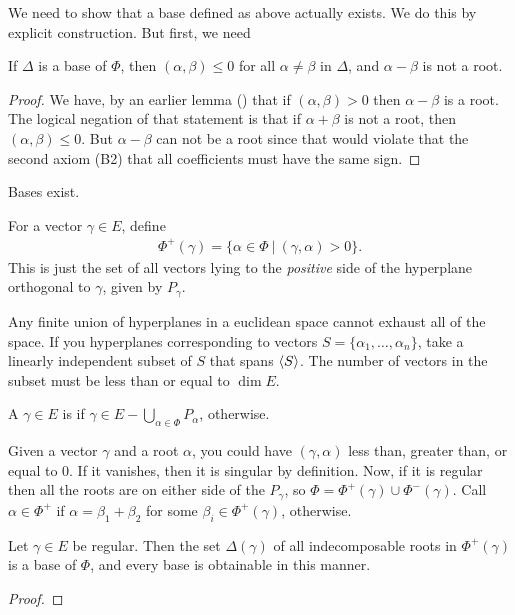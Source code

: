 We need to show that a base defined as above actually exists. We do this by explicit construction. But first, we need 
\begin{lemma}
    If $\Delta$ is a base of $\Phi$, then $(\alpha,\beta)\leq 0$  for all $\alpha\neq\beta$ in $\Delta$, and $\alpha-\beta$ is not a root.
\end{lemma}
\begin{proof}
    We have, by an earlier lemma () that if $(\alpha,\beta)>0$ then $\alpha - \beta$ is a root. The logical negation of that statement is that if $\alpha + \beta$ is not a root, then $(\alpha,\beta)\leq 0$. But $\alpha-\beta$ can not be a root since that would violate that the second axiom (B2) that all coefficients must have the same sign.
\end{proof}
\begin{theorem}
    Bases exist.
\end{theorem}
    For a vector $\gamma\in E$, define 
    \begin{align}
        \Phi^+(\gamma) = \{\alpha\in\Phi\ |\ (\gamma,\alpha)>0\}.
    \end{align}
    This is just the set of all vectors lying to the \emph{positive} side of the hyperplane orthogonal to $\gamma$, given by $P_\gamma$. 
    \begin{insight}
        Any finite union of hyperplanes in a euclidean space cannot exhaust all of the space. If you hyperplanes corresponding to vectors $S=\{\alpha_1,\dotsc,\alpha_n\}$, take a linearly independent subset of $S$ that spans $\langle S\rangle$. The number of vectors in the subset must be less than or equal to $\dim E$. 
    \end{insight}

    A $\gamma\in E$ is  if $\gamma\in E - \bigcup_{\alpha\in\Phi}P_\alpha$,  otherwise.

    Given a vector $\gamma$ and a root $\alpha$, you could have $(\gamma,\alpha)$ less than, greater than, or equal to 0. If it vanishes, then it is singular by definition. Now, if it is regular then all the roots are on either side of the $P_\gamma$, so $\Phi = \Phi^+(\gamma)\cup \Phi^-(\gamma)$. Call $\alpha\in \Phi^+$  if $\alpha = \beta_1 + \beta_2$ for some $\beta_i\in \Phi^+(\gamma)$,  otherwise.

\begin{theorem}
    Let $\gamma\in E$ be regular. Then the set $\Delta(\gamma)$  of all indecomposable roots in $\Phi^+(\gamma)$ is a base of $\Phi$, and every base is obtainable in this manner.
\end{theorem}
\begin{proof}
\end{proof}

